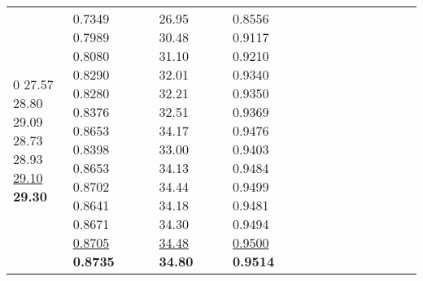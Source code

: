 \documentclass[runningheads]{llncs}
\begin{document}
\begin{table}[!ht]
\begin{tabular}{|p{7em}|p{2.5em}|p{2.5em}|p{3em}|p{2.5em}|p{3em}|p{2.5em}|p{3em}|p{2.5em}|p{3em}|p{2.5em}|p{3em}|}
0 \newline{}27.57 \newline{}28.80 \newline{}29.09 \newline{}28.73 \newline{}28.93 \newline{}\underline{29.10} \newline{}\bfseries{29.30} & 0.7349 \newline{}0.7989 \newline{}0.8080 \newline{}0.8290 \newline{}0.8280 \newline{}0.8376 \newline{}0.8653 \newline{}0.8398 \newline{}0.8653 \newline{}0.8702 \newline{}0.8641 \newline{}0.8671 \newline{}\underline{0.8705} \newline{}\bfseries{0.8735} & 26.95 \newline{}30.48 \newline{}31.10 \newline{}32.01 \newline{}32.21 \newline{}32.51 \newline{}34.17 \newline{}33.00 \newline{}34.13 \newline{}34.44 \newline{}34.18 \newline{}34.30 \newline{}\underline{34.48} \newline{}\bfseries{34.80} & 0.8556 \newline{}0.9117 \newline{}0.9210 \newline{}0.9340 \newline{}0.9350 \newline{}0.9369 \newline{}0.9476 \newline{}0.9403 \newline{}0.9484 \newline{}0.9499 \newline{}0.9481 \newline{}0.9494 \newline{}\underline{0.9500} \newline{}\bfseries{0.9514}\\

\end{tabular}
\end{table}
\end{document}
